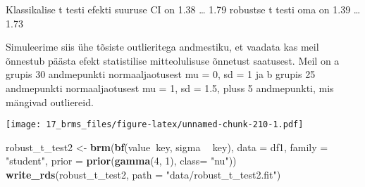 \documentclass[]{article}
\newenvironment{Shaded}{\begin{snugshade}}{\end{snugshade}}
\newcommand{\KeywordTok}[1]{\textcolor[rgb]{0.13,0.29,0.53}{\textbf{#1}}}
\newcommand{\DataTypeTok}[1]{\textcolor[rgb]{0.13,0.29,0.53}{#1}}
\newcommand{\DecValTok}[1]{\textcolor[rgb]{0.00,0.00,0.81}{#1}}
\newcommand{\FloatTok}[1]{\textcolor[rgb]{0.00,0.00,0.81}{#1}}
\newcommand{\StringTok}[1]{\textcolor[rgb]{0.31,0.60,0.02}{#1}}
\newcommand{\OperatorTok}[1]{\textcolor[rgb]{0.81,0.36,0.00}{\textbf{#1}}}
\newcommand{\NormalTok}[1]{#1}
\begin{document}
Klassikalise t testi efekti suuruse CI on 1.38 \ldots{} 1.79 robustse t
testi oma on 1.39 \ldots{} 1.73

Simuleerime siis ühe tõsiste outlieritega andmestiku, et vaadata kas
meil õnnestub päästa efekt statistilise mitteolulisuse õnnetust
saatusest. Meil on a grupis 30 andmepunkti normaaljaotusest mu = 0, sd =
1 ja b grupis 25 andmepunkti normaaljaotusest mu = 1, sd = 1.5, pluss 5
andmepunkti, mis mängivad outliereid.

\begin{Shaded}
\end{Shaded}

\texttt{[image: 17\_brms\_files/figure-latex/unnamed-chunk-210-1.pdf]}

\begin{Shaded}
\begin{Highlighting}[]
\NormalTok{robust_t_test2 <-}\StringTok{ }\KeywordTok{brm}\NormalTok{(}\KeywordTok{bf}\NormalTok{(value}\OperatorTok{~}\NormalTok{key, sigma }\OperatorTok{~}\StringTok{ }\NormalTok{key), }
            \DataTypeTok{data =}\NormalTok{ df1, }
            \DataTypeTok{family =} \StringTok{"student"}\NormalTok{, }
            \DataTypeTok{prior =} \KeywordTok{prior}\NormalTok{(}\KeywordTok{gamma}\NormalTok{(}\DecValTok{4}\NormalTok{, }\DecValTok{1}\NormalTok{), }\DataTypeTok{class=} \StringTok{"nu"}\NormalTok{))}
\KeywordTok{write_rds}\NormalTok{(robust_t_test2, }\DataTypeTok{path =} \StringTok{"data/robust_t_test2.fit"}\NormalTok{)}
\end{Highlighting}
\end{Shaded}
\end{document}

